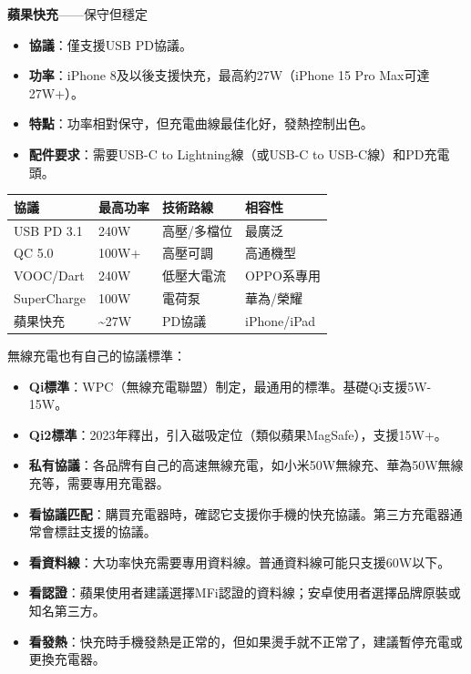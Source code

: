 \textbf{蘋果快充}——保守但穩定

\begin{itemize}
  \item \textbf{協議}：僅支援USB PD協議。
  \item \textbf{功率}：iPhone 8及以後支援快充，最高約27W（iPhone 15 Pro Max可達27W+）。
  \item \textbf{特點}：功率相對保守，但充電曲線最佳化好，發熱控制出色。
  \item \textbf{配件要求}：需要USB-C to Lightning線（或USB-C to USB-C線）和PD充電頭。
\end{itemize}


\begin{center}
\begin{tabularx}{\linewidth}{|X|X|X|X|}
\hline
\textbf{協議} & \textbf{最高功率} & \textbf{技術路線} & \textbf{相容性} \tabularnewline
\hline
USB PD 3.1 & 240W & 高壓/多檔位 & 最廣泛 \tabularnewline
QC 5.0 & 100W+ & 高壓可調 & 高通機型 \tabularnewline
VOOC/Dart & 240W & 低壓大電流 & OPPO系專用 \tabularnewline
SuperCharge & 100W & 電荷泵 & 華為/榮耀 \tabularnewline
蘋果快充 & \textasciitilde{}27W & PD協議 & iPhone/iPad \tabularnewline
\hline
\end{tabularx}
\end{center}


無線充電也有自己的協議標準：

\begin{itemize}
  \item \textbf{Qi標準}：WPC（無線充電聯盟）制定，最通用的標準。基礎Qi支援5W-15W。
  \item \textbf{Qi2標準}：2023年釋出，引入磁吸定位（類似蘋果MagSafe），支援15W+。
  \item \textbf{私有協議}：各品牌有自己的高速無線充電，如小米50W無線充、華為50W無線充等，需要專用充電器。
\end{itemize}


\begin{itemize}
  \item \textbf{看協議匹配}：購買充電器時，確認它支援你手機的快充協議。第三方充電器通常會標註支援的協議。
  \item \textbf{看資料線}：大功率快充需要專用資料線。普通資料線可能只支援60W以下。
  \item \textbf{看認證}：蘋果使用者建議選擇MFi認證的資料線；安卓使用者選擇品牌原裝或知名第三方。
  \item \textbf{看發熱}：快充時手機發熱是正常的，但如果燙手就不正常了，建議暫停充電或更換充電器。
\end{itemize}

